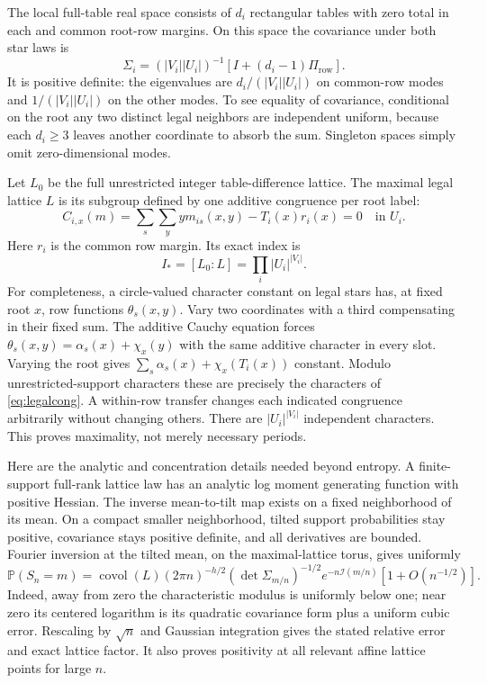 \documentclass[11pt]{article}
\newcommand{\Prob}{\mathbb P}
\newcommand{\covol}{\operatorname{covol}}
\begin{document}
The local full-table real space consists of $d_i$ rectangular tables with zero total in each and common root-row margins. On this space the covariance under both star laws is
\begin{equation}\label{eq:cov}
 \Sigma_i=(|V_i||U_i|)^{-1}[I+(d_i-1)\Pi_{\mathrm{row}}].
\end{equation}
It is positive definite: the eigenvalues are $d_i/(|V_i||U_i|)$ on common-row modes and $1/(|V_i||U_i|)$ on the other modes. To see equality of covariance, conditional on the root any two distinct legal neighbors are independent uniform, because each $d_i\ge3$ leaves another coordinate to absorb the sum. Singleton spaces simply omit zero-dimensional modes.

Let $L_0$ be the full unrestricted integer table-difference lattice. The maximal legal lattice $L$ is its subgroup defined by one additive congruence per root label:
\begin{equation}\label{eq:legalcong}
 C_{i,x}(m)=\sum_s\sum_y y m_{is}(x,y)-T_i(x)r_i(x)=0
 \quad\text{in }U_i.
\end{equation}
Here $r_i$ is the common row margin. Its exact index is
\begin{equation}\label{eq:index}
 I_*=[L_0:L]=\prod_i|U_i|^{|V_i|}.
\end{equation}
For completeness, a circle-valued character constant on legal stars has, at fixed root $x$, row functions $\theta_s(x,y)$. Vary two coordinates with a third compensating in their fixed sum. The additive Cauchy equation forces $\theta_s(x,y)=\alpha_s(x)+\chi_x(y)$ with the same additive character in every slot. Varying the root gives $\sum_s\alpha_s(x)+\chi_x(T_i(x))$ constant. Modulo unrestricted-support characters these are precisely the characters of \eqref{eq:legalcong}. A within-row transfer changes each indicated congruence arbitrarily without changing others. There are $|U_i|^{|V_i|}$ independent characters. This proves maximality, not merely necessary periods.

Here are the analytic and concentration details needed beyond entropy. A finite-support full-rank lattice law has an analytic log moment generating function with positive Hessian. The inverse mean-to-tilt map exists on a fixed neighborhood of its mean. On a compact smaller neighborhood, tilted support probabilities stay positive, covariance stays positive definite, and all derivatives are bounded. Fourier inversion at the tilted mean, on the maximal-lattice torus, gives uniformly
\[
 \Prob(S_n=m)=\covol(L)(2\pi n)^{-h/2}
 (\det\Sigma_{m/n})^{-1/2}e^{-n\mathcal I(m/n)}
 [1+O(n^{-1/2})].
\]
Indeed, away from zero the characteristic modulus is uniformly below one; near zero its centered logarithm is its quadratic covariance form plus a uniform cubic error. Rescaling by $\sqrt n$ and Gaussian integration gives the stated relative error and exact lattice factor. It also proves positivity at all relevant affine lattice points for large $n$.
\end{document}

